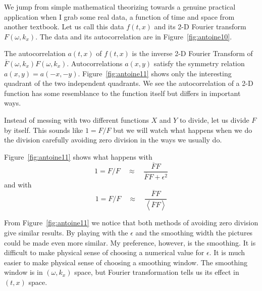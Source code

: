 
\par
We jump from simple mathematical theorizing
towards a genuine practical application when I grab some real data,
a function of time and space from another textbook.
Let us call this data $f(t,x)$ and its 2-D Fourier transform
$F(\omega, k_x)$.
The data and its autocorrelation are in Figure~\ref{fig:antoine10}.

\par
{}
\par
The autocorrelation $a(t,x)$ of $f(t,x)$ is
the inverse 2-D Fourier Transform  of 
$ \overline{F}(\omega, k_x) F(\omega, k_x)$.
Autocorrelations $a(x,y)$
satisfy the symmetry relation
$a(x,y)=a(-x,-y)$.
Figure~\ref{fig:antoine11}
shows only the interesting quadrant of the two independent quadrants.
We see the autocorrelation of a 2-D function has some
resemblance to the function itself but differs in important ways.

\par
Instead of messing with two different functions $X$ and $Y$ to divide,
let us divide $F$ by itself.
This sounds like $1=F/F$ but we will
watch what happens when we do the division carefully
avoiding zero division in the ways we usually do.
\par
Figure~\ref{fig:antoine11} shows
what happens with
\begin{equation}
\label{eqn:z7}
1 = F/F \quad \approx \quad \frac{\overline{F}F}{\overline{F}F+\epsilon^2}
\end{equation}
and with
\begin{equation}
\label{eqn:z8}
1 = F/F \quad \approx\quad  \frac{\overline{F}F}{\left< \overline{F}F \right>}
\end{equation}

From Figure~\ref{fig:antoine11} we notice that both methods of
avoiding zero division give similar results.
By playing with the $\epsilon$ and the smoothing width
the pictures could be made even more similar.
My preference, however, is the smoothing.
It is difficult to make physical sense of choosing a numerical value
for $\epsilon$.
It is much easier to make physical sense of choosing a smoothing window.
The smoothing window is in $(\omega,k_x)$ space,
but Fourier transformation tells us its effect in $(t,x)$ space.

